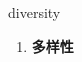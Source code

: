 
\begin{frame}
{\huge diversity}
\begin{center}
\begin{enumerate}\Large
  \item \textbf{多样性}
\end{enumerate}
\end{center}
\end{frame}
